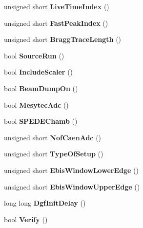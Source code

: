\begin{DoxyCompactItemize}
unsigned short {\bfseries Live\+Time\+Index} ()
\item 
\mbox{\label{class_global_settings_a3045c1e47cf31b2a1f2cdd036d2983d1}} 
unsigned short {\bfseries Fast\+Peak\+Index} ()
\item 
\mbox{\label{class_global_settings_a736690f2a63bcdb18f04f9831a484240}} 
unsigned short {\bfseries Bragg\+Trace\+Length} ()
\item 
\mbox{\label{class_global_settings_a111d8b0e788e3709b00702f3a7ae2728}} 
bool {\bfseries Source\+Run} ()
\item 
\mbox{\label{class_global_settings_a49c569d0d122bff3736e8e3debbfd013}} 
bool {\bfseries Include\+Scaler} ()
\item 
\mbox{\label{class_global_settings_a817f8562e00c84885bb367d33b409b76}} 
bool {\bfseries Beam\+Dump\+On} ()
\item 
\mbox{\label{class_global_settings_acfaa849a405a80e912b1c42c7b0c258c}} 
bool {\bfseries Mesytec\+Adc} ()
\item 
\mbox{\label{class_global_settings_a4a48a1c192b77998f1b1111d73aeaf5a}} 
bool {\bfseries S\+P\+E\+D\+E\+Chamb} ()
\item 
\mbox{\label{class_global_settings_a0451be00dc54ba72b862ba682399e5e2}} 
unsigned short {\bfseries Nof\+Caen\+Adc} ()
\item 
\mbox{\label{class_global_settings_a5fd349a287cbe0159fb24d4ae2264fbb}} 
unsigned short {\bfseries Type\+Of\+Setup} ()
\item 
\mbox{\label{class_global_settings_ae3067cec604f4bf7692c2a635411ffa3}} 
unsigned short {\bfseries Ebis\+Window\+Lower\+Edge} ()
\item 
\mbox{\label{class_global_settings_ad13bfa3edd5436f4096e52d742348da7}} 
unsigned short {\bfseries Ebis\+Window\+Upper\+Edge} ()
\item 
\mbox{\label{class_global_settings_a2b7b49aa025fef97a5c5bf50f7b181c7}} 
long long {\bfseries Dgf\+Init\+Delay} ()
\item 
\mbox{\label{class_global_settings_a7057529627ce885278a417a6b31634fd}} 
bool {\bfseries Verify} ()
\end{DoxyCompactItemize}
